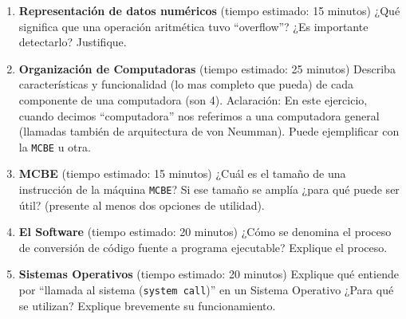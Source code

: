 \documentclass[12pt]{article}
\def\maketitle{

\makeatletter{
    \color{blue} \centering \huge \sc
    \textbf{
        Examen final regular
    }\\
    \par
}
\makeatother

\makeatletter


}
\begin{document}
\begin{minipage}[c]{\linewidth}
\thispagestyle{empty}
\maketitle
\setlength{\parindent}{1pt}

\begin{enumerate}[topsep=4pt,itemsep=2pt,partopsep=2pt, parsep=2pt]

    \item \textbf{Representación de datos numéricos}
        \small{(tiempo estimado: 15 minutos)}
        ¿Qué significa que una operación aritmética tuvo ``overflow''? ¿Es
        importante detectarlo? Justifique.

    \item \textbf{Organización de Computadoras}
        \small{(tiempo estimado: 25 minutos)}
        Describa características y funcionalidad (lo mas completo que pueda)
        de cada componente de una computadora (son 4). Aclaración: En este
        ejercicio, cuando decimos ``computadora'' nos referimos a una
        computadora general (llamadas también de arquitectura de von Neumman).
        Puede ejemplificar con la \texttt{MCBE} u otra.

    \item \textbf{MCBE}
        \small{(tiempo estimado: 15 minutos)} ¿Cuál es el tamaño de una
        instrucción de la máquina \texttt{MCBE}? Si ese tamaño se amplía ¿para
        qué puede ser útil? (presente al menos dos opciones de utilidad).

    \item \textbf{El Software}
        \small{(tiempo estimado: 20 minutos)} ¿Cómo se denomina el proceso de
        conversión de código fuente a programa ejecutable? Explique el
        proceso.

    \item \textbf{Sistemas Operativos}
        \small{(tiempo estimado: 20 minutos)} Explique qué entiende por
        ``llamada al sistema (\texttt{system call})'' en un Sistema Operativo
        ¿Para qué se utilizan? Explique brevemente su funcionamiento.

\end{enumerate}
\end{minipage}

\vspace{5em}
\end{document}
